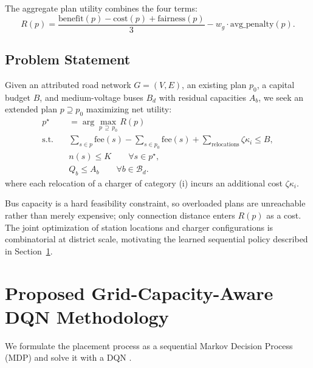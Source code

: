 \documentclass[graybox]{svmult}
\begin{document}
\label{subsubsec:utility}
The aggregate plan utility combines the four terms:
\begin{equation}
\label{eq:utility}
R(p)=\frac{\mathrm{benefit}(p)-\mathrm{cost}(p)+\mathrm{fairness}(p)}{3}-w_g\cdot\mathrm{avg\_penalty}(p).
\end{equation}

\subsection{Problem Statement}
\label{subsec:problem}

Given an attributed road network $G=(V,E)$, an existing plan $p_0$, a capital budget $B$, and medium-voltage buses $B_d$ with residual capacities $A_b$, we seek an extended plan $p\supseteq p_0$ maximizing net utility:
\begin{align}
p^\star &= \arg\max_{p\,\supseteq\,p_0} R(p) \label{eq:objective}\\
\text{s.t.}\quad & \sum_{s\in p}\mathrm{fee}(s)-\sum_{s\in p_0}\mathrm{fee}(s) + \sum_{\text{relocations}} \zeta\kappa_i \le B, \label{eq:budget}\\
& n(s)\le K \qquad \forall s\in p^\star , \label{eq:cap}\\
& Q_b\le A_b \qquad \forall b\in\mathcal{B}_d . \label{eq:capgrid}
\end{align}
where each relocation of a charger of category (i) incurs an additional cost $\zeta\kappa_i$.


Bus capacity is a hard feasibility constraint, so overloaded plans are unreachable rather than merely expensive; only connection distance enters $R(p)$ as a cost. The joint optimization of station locations and charger configurations is combinatorial at district scale, motivating the learned sequential policy described in Section~\ref{sec:method}.

\section{Proposed Grid-Capacity-Aware DQN Methodology}
\label{sec:method}
We formulate the placement process as a sequential Markov Decision Process (MDP) and solve it with a DQN \cite{mnih2015human}.
\end{document}
